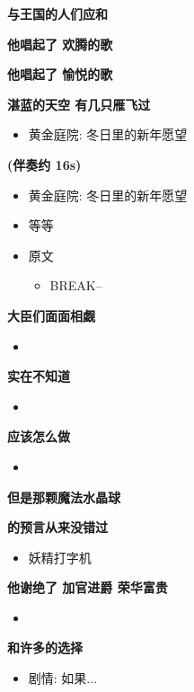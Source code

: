 \documentclass[a4paper]{article}
\begin{document}
\textbf{与王国的人们应和}

\textbf{他唱起了 欢腾的歌}

\textbf{他唱起了 愉悦的歌}

\textbf{湛蓝的天空 有几只雁飞过}

\begin{itemize}
    \item 黄金庭院: 冬日里的新年愿望
\end{itemize}

\textbf{(伴奏约 16s)}

\begin{itemize}
    \item 黄金庭院: 冬日里的新年愿望
    \item 等等
    \item 原文
    \begin{itemize}
        \item BREAK--
    \end{itemize}
\end{itemize}

\textbf{大臣们面面相觑}

\begin{itemize}
    \item 
\end{itemize}

\textbf{实在不知道}

\begin{itemize}
    \item 
\end{itemize}

\textbf{应该怎么做}

\begin{itemize}
    \item 
\end{itemize}

\textbf{但是那颗魔法水晶球}

\textbf{的预言从来没错过}

\begin{itemize}
    \item 妖精打字机
\end{itemize}

\textbf{他谢绝了 加官进爵 荣华富贵}

\begin{itemize}
    \item 
\end{itemize}

\textbf{和许多的选择}

\begin{itemize}
    \item 剧情: 如果...
\end{itemize}
\end{document}

